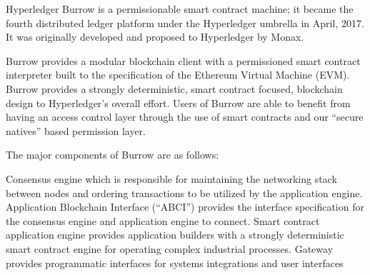 Hyperledger Burrow is a permissionable smart contract machine; it became the fourth distributed ledger platform under the Hyperledger umbrella in April, 2017. It was originally developed and proposed to Hyperledger by Monax. 

Burrow provides a modular blockchain client with a permissioned smart contract interpreter built to the specification of the Ethereum Virtual Machine (EVM). Burrow provides a strongly deterministic, smart contract focused, blockchain design to Hyperledger's overall effort. Users of Burrow are able to benefit from having an access control layer through the use of smart contracts and our “secure natives” based permission layer. 
 
The major components of Burrow are as follows:
 
Consensus engine which is responsible for maintaining the networking stack between nodes and ordering transactions to be utilized by the application engine.
Application Blockchain Interface (“ABCI”) provides the interface specification for the consensus engine and application engine to connect.
Smart contract application engine provides application builders with a strongly deterministic smart contract engine for operating complex industrial processes.
Gateway provides programmatic interfaces for systems integrations and user interfaces
